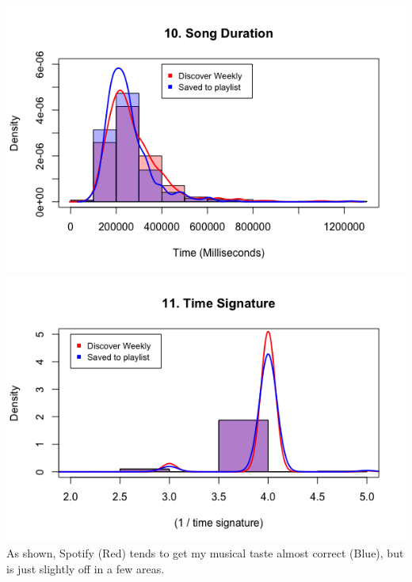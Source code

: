 \documentclass{article}
\begin{document}
		\includegraphics[width=\textwidth]{10_song_dur}\\
		\includegraphics[width=\textwidth]{11_time_sig}\\
		
		As shown, Spotify (Red) tends to get my musical taste almost correct (Blue), but is just slightly off in a few areas. 
		
\end{document}

